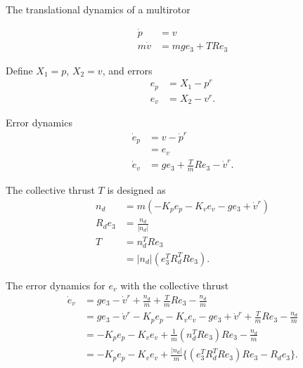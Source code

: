 \documentclass{article}
\begin{document}
The translational dynamics of a multirotor

\begin{align}
\dot{p} &= v \nonumber \\
m\dot{v} &= mge_3 + TRe_3 \nonumber %
\end{align}

Define $X_1 = p$, $X_2 = v$, and errors
\begin{align}
e_p &= X_1 - p^r \nonumber \\
e_v &= X_2 - v^r. \nonumber
\end{align}

Error dynamics
\begin{align}
\dot{e}_p &= v - \dot{p}^r \nonumber \\
&= e_v \nonumber \\
\dot{e}_v &= ge_3 + \frac{T}{m}Re_3 - \dot{v}^r. \nonumber 
\end{align}

The collective thrust $T$ is designed as
\begin{align}
n_d &= m(-K_pe_p - K_ve_v -ge_3 + \dot{v}^r) \nonumber \\
R_de_3 &= \frac{n_d}{|n_d|}  \nonumber \\
T &= n_d^TRe_3 \nonumber \\
&= |n_d| (e_3^TR_d^TRe_3). \nonumber
\end{align}

The error dynamics for $e_v$ with the collective thrust
\begin{align}
\dot{e}_v &= ge_3 - \dot{v}^r + \frac{n_d}{m} +\frac{T}{m}Re_3 - \frac{n_d}{m}\nonumber \\
 &= ge_3 - \dot{v}^r  - K_pe_p - K_ve_v -ge_3 + \dot{v}^r +\frac{T}{m}Re_3 - \frac{n_d}{m} \nonumber  \\
&= -K_pe_p -K_ve_v  + \frac{1}{m}(n_d^TRe_3)Re_3 -\frac{n_d}{m} \nonumber \\
&= -K_pe_p-K_ve_v + \frac{|n_d|}{m}\{(e_3^TR_d^TRe_3)Re_3 - R_de_3\}. \nonumber
\end{align}
\end{document}
